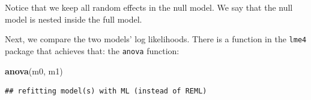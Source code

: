 \documentclass[12pt,]{krantz}
\newenvironment{Shaded}{\begin{snugshade}}{\end{snugshade}}
\newcommand{\DataTypeTok}[1]{\textcolor[rgb]{0.13,0.29,0.53}{#1}}
\newcommand{\DecValTok}[1]{\textcolor[rgb]{0.00,0.00,0.81}{#1}}
\newcommand{\KeywordTok}[1]{\textcolor[rgb]{0.13,0.29,0.53}{\textbf{#1}}}
\newcommand{\NormalTok}[1]{#1}
\newcommand{\OperatorTok}[1]{\textcolor[rgb]{0.81,0.36,0.00}{\textbf{#1}}}
\newcommand{\OtherTok}[1]{\textcolor[rgb]{0.56,0.35,0.01}{#1}}
\newcommand{\StringTok}[1]{\textcolor[rgb]{0.31,0.60,0.02}{#1}}
\begin{document}
\begin{Shaded}
\end{Shaded}

Notice that we keep all random effects in the null model. We say that the null model is nested inside the full model.

Next, we compare the two models' log likelihoods. There is a function in the \texttt{lme4} package that achieves that: the \texttt{anova} function:

\begin{Shaded}
\begin{Highlighting}[]
\KeywordTok{anova}\NormalTok{(m0, m1)}
\end{Highlighting}
\end{Shaded}

\begin{verbatim}
## refitting model(s) with ML (instead of REML)
\end{verbatim}
\end{document}
